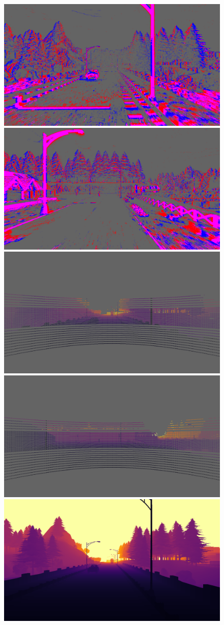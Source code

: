 \begin{figure}
  \centering
  \includegraphics[width=0.475\linewidth]{mainmatter/figures/c_depth_transf/sled_dense_cmp_additional/data_and_gt/evts000750_lightgray_fixed.png}
  \includegraphics[width=0.475\linewidth]{mainmatter/figures/c_depth_transf/sled_dense_cmp_additional/data_and_gt/evts000994_lightgray_fixed.png}\\
  \includegraphics[width=0.475\linewidth]{mainmatter/figures/c_depth_transf/sled_dense_cmp_additional/data_and_gt/lidar000750_lightgray_fixed.png}
  \includegraphics[width=0.475\linewidth]{mainmatter/figures/c_depth_transf/sled_dense_cmp_additional/data_and_gt/lidar000994_lightgray_fixed.png}\\
  \includegraphics[width=0.475\linewidth]{mainmatter/figures/c_depth_transf/sled_dense_cmp_additional/data_and_gt/gtprev000750.png}

\end{figure}
